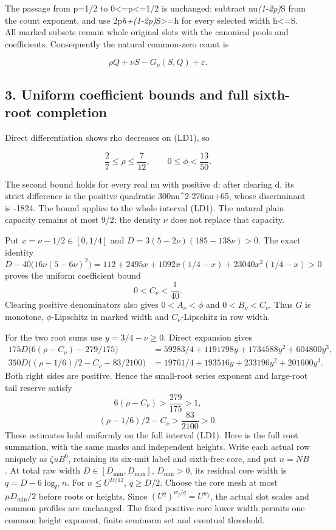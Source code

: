 The passage from p=1/2 to 0\textless=p\textless=1/2 is unchanged: subtract nu\emph{(1-2p)}S from the count exponent, and use 2p\emph{h+(1-2p)}S\textgreater=h for every selected width h\textless=S. All marked subsets remain whole original slots with the canonical pools and coefficients. Consequently the natural common-zero count is

\[
             \rho Q+\nu S-G_\nu(S,Q)+\varepsilon.       \tag{LD9}
\]

\hypertarget{sources:uniform-coefficient-bounds-and-full-sixth-root-completion}{%
\subsection{3. Uniform coefficient bounds and full sixth-root completion}\label{sources:uniform-coefficient-bounds-and-full-sixth-root-completion}}

Direct differentiation shows rho decreases on (LD1), so

\[
 \frac27\le\rho\le\frac7{12},\qquad
                 0\le\phi<\frac{13}{50}.             \tag{LD10}
\]

The second bound holds for every real nu with positive d: after clearing d, its strict difference is the positive quadratic 300nu\^{}2-276nu+65, whose discriminant is -1824. The bound applies to the whole interval (LD1). The natural plain capacity remains at most 9/2; the density \ensuremath{\nu} does not replace that capacity.

Put \(x=\nu-1/2\in[0,1/4]\) and
\(D=3(5-2\nu)(185-138\nu)>0\). The exact identity
\[
 D-40\bigl(16\nu(5-6\nu)^2\bigr)
 =112+2495x+1092x(1/4-x)+23040x^2(1/4-x)>0
\]
proves the uniform coefficient bound
\[
                    0<C_\nu<\frac1{40}.                 \tag{LD11}
\]
Clearing positive denominators also gives
\(0<A_\nu<\phi\) and \(0<B_\nu<C_\nu\).
Thus \(G\) is monotone, \(\phi\)-Lipschitz in marked width and
\(C_\nu\)-Lipschitz in row width.

For the two root sums use \(y=3/4-\nu\ge0\). Direct expansion gives
\[
\begin{aligned}
175D\bigl(6(\rho-C_\nu)-279/175\bigr)
 &=59283/4+1191798y+1734588y^2+604800y^3,\\
350D\bigl((\rho-1/6)/2-C_\nu-83/2100\bigr)
 &=19761/4+193516y+233196y^2+201600y^3.
\end{aligned}
\]
Both right sides are positive. Hence the small-root series exponent and
large-root tail reserve satisfy
\[
                   6(\rho-C_\nu)>\frac{279}{175}>1,       \tag{LD12}
\]
\[
              (\rho-1/6)/2-C_\nu>\frac{83}{2100}>0.       \tag{LD13}
\]
These estimates hold uniformly on the full interval (LD1).
Here is the full root summation, with the same masks and independent
heights. Write each actual row uniquely as \(\zeta uB^6\), retaining
its six-unit label and sixth-free core, and put \(n=NB\).
At total raw width \(D\in[D_{\min},D_{\max}]\),
\(D_{\min}>0\), its residual core width is
\(q=D-6\log_U n\). For \(n\le U^{D/12}\),
\(q\ge D/2\). Choose the core mesh at most
\(\mu D_{\min}/2\) before roots or heights.
Since \((U^q)^{w_j/q}=U^{w_j}\), the actual slot scales and common
profiles are unchanged. The fixed positive core lower width permits
one common height exponent, finite seminorm set and eventual threshold.


